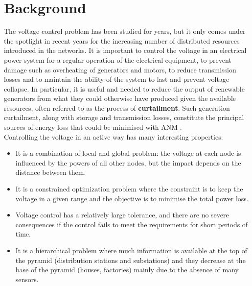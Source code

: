 \chapter{Background}
The voltage control problem has been studied for years, but it only comes under the spotlight in recent years for the increasing number of distributed resources introduced in the networks. It is important to control the voltage in an electrical power system for a regular operation of the electrical equipment, to prevent damage such as overheating of generators and motors, to reduce transmission losses and to maintain the ability of the system to last and prevent voltage collapse.
In particular, it is useful and needed to reduce the output of renewable generators from what they could otherwise have produced given the available resources, often referred to as the process of \textbf{curtailment}. Such generation curtailment, along with storage and transmission losses, constitute the principal sources of energy loss that could be minimised with \gls{ANM} \cite{gym-anm}. \\

\noindent Controlling the voltage in an active way has many interesting properties:
\begin{itemize}
    \item It is a combination of local and global problem: the voltage at each node is influenced by the powers of all other nodes, but the impact depends on the distance between them.
    \item It is a constrained optimization problem where the constraint is to keep the voltage in a given range and the objective is to minimise the total power loss.
    \item Voltage control has a relatively large tolerance, and there are no severe consequences if the control fails to meet the requirements for short periods of time. \cite{wang2022multiagent}
    \item It is a hierarchical problem where much information is available at the top of the pyramid (distribution stations and substations) and they decrease at the base of the pyramid (houses, factories) mainly due to the absence of many sensors.
\end{itemize}

